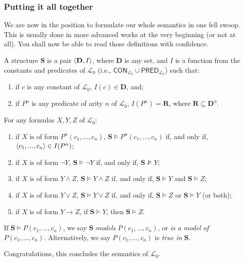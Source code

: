 \subsubsection{Putting it all together}

We are now in the position to formulate our whole semantics in one fell swoop. This is usually done in more advanced works at the very beginning (or not at all). You shall now be able to read those definitions with confidence. 

\begin{defn} \label{models}
	A structure $\mathbf{S}$ is a pair $\langle\mathbf{D}, I\rangle$, where $\mathbf{D}$ is any set, and $I$ is a function from the constants and predicates of $\mathcal{L}_0$ (i.e., $\mathsf{CON}_{\mathcal{L}_0} \cup \mathsf{PRED}_{\mathcal{L}_0}$) such that:
	\begin{enumerate}
		\item if $c$ is any constant of $\mathcal{L}_0$, $I(c) \in \mathbf{D}$, and;
		\item if $P^n$ is any predicate  of arity $n$ of $\mathcal{L}_0$, $I(P^n)=\mathbf{R}$, where $\mathbf{R} \subseteq \mathbf{D}^n$. 
	\end{enumerate}
	For any formulas $X, Y, Z$ of $\mathcal{L}_0$:
	
	\begin{enumerate}
	\item if $X$ is of form $P^n(c_1, ..., c_n)$, $\mathbf{S} \models P^n(c_1, ..., c_n)$ if, and only if, $\langle c_1, ..., c_n\rangle \in I(P^n)$;
	\item if $X$ is of form $\neg Y$, $\mathbf{S} \models \neg Y$ if, and only if, $\mathbf{S} \not\models Y$;
	\item if $X$ is of form $Y \wedge Z$, $\mathbf{S} \models Y \wedge Z$ if, and only if, $\mathbf{S} \models Y$ and $\mathbf{S}\models Z$;
	\item if $X$ is of form $Y \vee Z$,  $\mathbf{S} \models Y \vee Z$ if, and only if, $\mathbf{S} \models Z$ or $\mathbf{S}\models Y$ (or both);
	\item if $X$ is of form $Y \rightarrow Z$, if $\mathbf{S} \models Y$, then $\mathbf{S} \models Z$. 
	\end{enumerate}
	
	If $\mathbf{S} \models P(c_1, ..., c_n)$, we say $\mathbf{S}$ \textit{models} $P(c_1, ..., c_n)$, or \textit{is a model of} $P(c_1, ..., c_n)$. Alternatively, we say $P(c_1, ..., c_n)$ is \textit{true in} $\mathbf{S}$.
\end{defn}

Congratulations, this concludes the semantics of $\mathcal{L}_0$.


